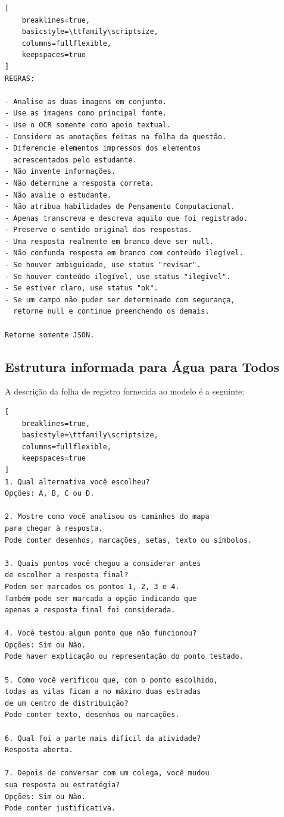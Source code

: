 \begin{lstlisting}[
    breaklines=true,
    basicstyle=\ttfamily\scriptsize,
    columns=fullflexible,
    keepspaces=true
]
REGRAS:

- Analise as duas imagens em conjunto.
- Use as imagens como principal fonte.
- Use o OCR somente como apoio textual.
- Considere as anotações feitas na folha da questão.
- Diferencie elementos impressos dos elementos
  acrescentados pelo estudante.
- Não invente informações.
- Não determine a resposta correta.
- Não avalie o estudante.
- Não atribua habilidades de Pensamento Computacional.
- Apenas transcreva e descreva aquilo que foi registrado.
- Preserve o sentido original das respostas.
- Uma resposta realmente em branco deve ser null.
- Não confunda resposta em branco com conteúdo ilegível.
- Se houver ambiguidade, use status "revisar".
- Se houver conteúdo ilegível, use status "ilegivel".
- Se estiver claro, use status "ok".
- Se um campo não puder ser determinado com segurança,
  retorne null e continue preenchendo os demais.

Retorne somente JSON.
\end{lstlisting}


\subsection*{Estrutura informada para Água para Todos}

A descrição da folha de registro fornecida ao modelo é a seguinte:

\begin{lstlisting}[
    breaklines=true,
    basicstyle=\ttfamily\scriptsize,
    columns=fullflexible,
    keepspaces=true
]
1. Qual alternativa você escolheu?
Opções: A, B, C ou D.

2. Mostre como você analisou os caminhos do mapa
para chegar à resposta.
Pode conter desenhos, marcações, setas, texto ou símbolos.

3. Quais pontos você chegou a considerar antes
de escolher a resposta final?
Podem ser marcados os pontos 1, 2, 3 e 4.
Também pode ser marcada a opção indicando que
apenas a resposta final foi considerada.

4. Você testou algum ponto que não funcionou?
Opções: Sim ou Não.
Pode haver explicação ou representação do ponto testado.

5. Como você verificou que, com o ponto escolhido,
todas as vilas ficam a no máximo duas estradas
de um centro de distribuição?
Pode conter texto, desenhos ou marcações.

6. Qual foi a parte mais difícil da atividade?
Resposta aberta.

7. Depois de conversar com um colega, você mudou
sua resposta ou estratégia?
Opções: Sim ou Não.
Pode conter justificativa.
\end{lstlisting}


